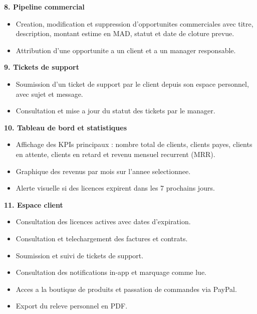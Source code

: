 \documentclass[12pt, a4paper]{report}
\begin{document}
\vspace{0.3cm}
\textbf{8. Pipeline commercial}

\begin{itemize}
  \item Creation, modification et suppression d'opportunites commerciales avec
        titre, description, montant estime en MAD, statut et date de cloture
        prevue.
  \item Attribution d'une opportunite a un client et a un manager responsable.
\end{itemize}

\vspace{0.3cm}
\textbf{9. Tickets de support}

\begin{itemize}
  \item Soumission d'un ticket de support par le client depuis son espace
        personnel, avec sujet et message.
  \item Consultation et mise a jour du statut des tickets par le manager.
\end{itemize}

\vspace{0.3cm}
\textbf{10. Tableau de bord et statistiques}

\begin{itemize}
  \item Affichage des KPIs principaux : nombre total de clients, clients payes,
        clients en attente, clients en retard et revenu mensuel recurrent (MRR).
  \item Graphique des revenus par mois sur l'annee selectionnee.
  \item Alerte visuelle si des licences expirent dans les 7 prochains jours.
\end{itemize}

\vspace{0.3cm}
\textbf{11. Espace client}

\begin{itemize}
  \item Consultation des licences actives avec dates d'expiration.
  \item Consultation et telechargement des factures et contrats.
  \item Soumission et suivi de tickets de support.
  \item Consultation des notifications in-app et marquage comme lue.
  \item Acces a la boutique de produits et passation de commandes via PayPal.
  \item Export du releve personnel en PDF.
\end{itemize}
\end{document}
